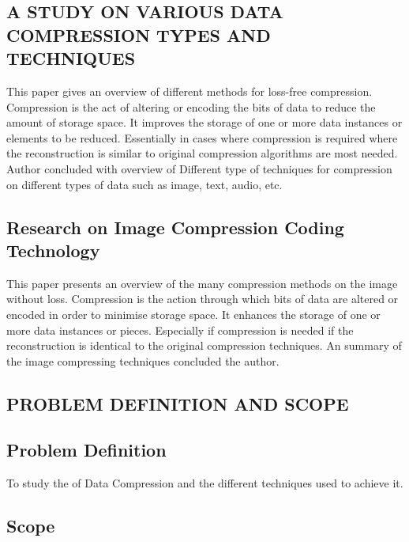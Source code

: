 \documentclass[a4paper, 12pt]{article}
\begin{document}
\subsection{A STUDY ON VARIOUS DATA COMPRESSION TYPES AND 
TECHNIQUES}
\hspace{1cm}  
This paper gives an overview of different methods for loss-free compression. 
Compression is the act of altering or encoding the bits of data to reduce the amount of 
storage space. It improves the storage of one or more data instances or elements to be 
reduced. Essentially in cases where compression is required where the reconstruction 
is similar to original compression algorithms are most needed.
Author concluded with overview of Different type of techniques for compression on 
different types of data such as image, text, audio, etc.



\subsection{Research on Image Compression Coding 
Technology}
\hspace{1cm} 
This paper presents an overview of the many compression methods on the image without loss.
Compression is the action through which bits of data are altered or encoded in order to minimise storage space. It enhances the storage of one or more data instances or pieces. Especially if compression is needed if the reconstruction is identical to the original compression techniques.
An summary of the image compressing techniques concluded the author.
\\

\newpage
\begin{center}
\section{PROBLEM DEFINITION AND SCOPE}
\end{center}

\subsection{Problem Definition}

\hspace{1.5cm} To study the of Data Compression and the different techniques used to achieve it.

\subsection{Scope}
\end{document}
